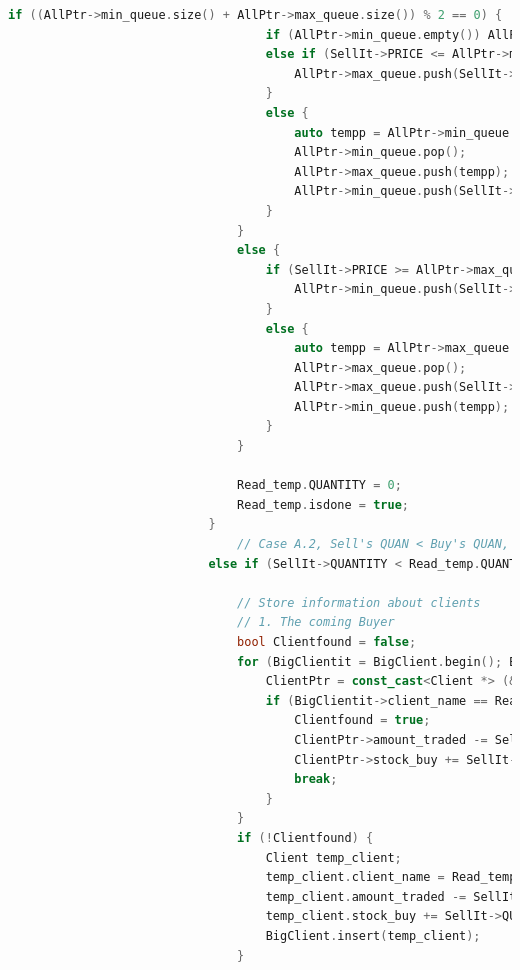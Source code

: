 \documentclass{article}
\begin{document}
\begin{lstlisting}[language=C++]
                                if ((AllPtr->min_queue.size() + AllPtr->max_queue.size()) % 2 == 0) {
                                    if (AllPtr->min_queue.empty()) AllPtr->max_queue.push(SellIt->PRICE);
                                    else if (SellIt->PRICE <= AllPtr->min_queue.top()) {
                                        AllPtr->max_queue.push(SellIt->PRICE);
                                    }
                                    else {
                                        auto tempp = AllPtr->min_queue.top();
                                        AllPtr->min_queue.pop();
                                        AllPtr->max_queue.push(tempp);
                                        AllPtr->min_queue.push(SellIt->PRICE);
                                    }
                                }
                                else {
                                    if (SellIt->PRICE >= AllPtr->max_queue.top()) {
                                        AllPtr->min_queue.push(SellIt->PRICE);
                                    }
                                    else {
                                        auto tempp = AllPtr->max_queue.top();
                                        AllPtr->max_queue.pop();
                                        AllPtr->max_queue.push(SellIt->PRICE);
                                        AllPtr->min_queue.push(tempp);
                                    }
                                }

                                Read_temp.QUANTITY = 0;
                                Read_temp.isdone = true;
                            }
                                // Case A.2, Sell's QUAN < Buy's QUAN, will recursive to Case A.1 or to Case A.3
                            else if (SellIt->QUANTITY < Read_temp.QUANTITY && Read_temp.PRICE >= SellIt->PRICE) {

                                // Store information about clients
                                // 1. The coming Buyer
                                bool Clientfound = false;
                                for (BigClientit = BigClient.begin(); BigClientit != BigClient.end(); BigClientit++) {
                                    ClientPtr = const_cast<Client *> (&(*BigClientit));
                                    if (BigClientit->client_name == Read_temp.CLIENT_NAME) {
                                        Clientfound = true;
                                        ClientPtr->amount_traded -= SellIt->QUANTITY * SellIt->PRICE;
                                        ClientPtr->stock_buy += SellIt->QUANTITY;
                                        break;
                                    }
                                }
                                if (!Clientfound) {
                                    Client temp_client;
                                    temp_client.client_name = Read_temp.CLIENT_NAME;
                                    temp_client.amount_traded -= SellIt->QUANTITY * SellIt->PRICE;
                                    temp_client.stock_buy += SellIt->QUANTITY;
                                    BigClient.insert(temp_client);
                                }


\end{lstlisting}
\end{document}
